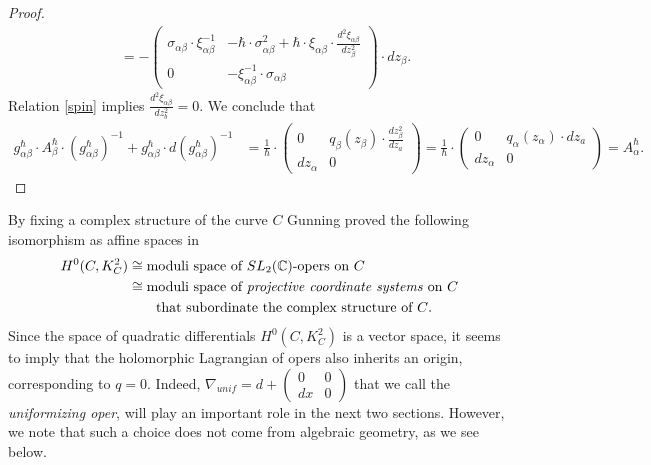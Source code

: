 \documentclass[oneside, 11pt]{amsart}
\theoremstyle{definition}
\numberwithin{equation}{subsection}
\def\a{\alpha}
\def\b{\beta}
\newcommand{\be}{\begin{equation}}
\newcommand{\ee}{\end{equation}}
\begin{document}
\begin{proof}
\begin{align}
\nonumber
&=-\begin{pmatrix}
\sigma_{\a\b}\cdot\xi_{\a\b}^{-1}&-\hbar\cdot\sigma_{\a\b}^2+\hbar\cdot \xi_{\a\b}\cdot\frac{d^2\xi_{\a\b}}{dz_{\b}^2}\\ 0& -\xi_{\a\b}^{-1}\cdot \sigma_{\a\b}
\end{pmatrix}\cdot dz_{\b}.
\nonumber
\end{align}
Relation \eqref{spin} implies $\frac{d^2\xi_{\a\b}}{dz_{b}^2}=0.$ 
We conclude that
\begin{align}
\nonumber
g_{\a\b}^{\hbar} \cdot A^{\hbar}_{\b}\cdot (g_{\a\b}^{\hbar})^{-1}+g_{\a\b}^{\hbar}\cdot d(g_{\a\b}^{\hbar})^{-1}&=\frac{1}{\hbar}\cdot
\begin{pmatrix}
0&q_\b(z_{\b})\cdot\frac{dz_{\b}^2}{dz_{a}}\\ dz_{\a}& 0
\end{pmatrix}=\frac{1}{\hbar}\cdot \begin{pmatrix}
0&q_\a(z_{\a})\cdot dz_{a}\\ dz_{\a}& 0
\end{pmatrix}=A_{\a}^{\hbar}.
\end{align}
\end{proof}


By fixing a complex structure of the curve $C$
Gunning proved the following isomorphism as affine spaces  in \cite{Gun}
\be
\begin{aligned}
H^{0}(C, K_C^{2})&\cong \text{moduli space of $SL_2(\mathbb{C})$-opers on $C$}\\
&\cong \text{moduli space of \textit{projective coordinate systems} on $C$}
\\
&\qquad 
\text{that
subordinate the complex structure of $C$}.
\end{aligned}
\ee
Since the space of quadratic differentials $H^{0}(C, K_C^{2})$ is a vector space, it 
seems to imply that the holomorphic Lagrangian of opers also inherits an origin, corresponding to $q=0$.
Indeed,
 $\nabla_{unif}=d+\begin{pmatrix}
0&0\\ dx& 0
\end{pmatrix}
$
that we call the \textit{uniformizing oper}, will 
play an important role in the next two sections. 
However, we note that such a choice does not
come from algebraic geometry, as we see below.
\end{document}
